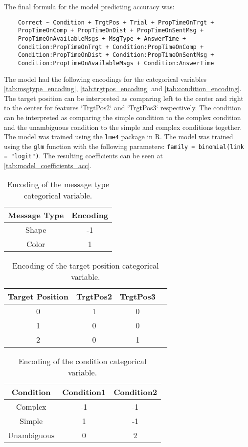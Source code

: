 The final formula for the model predicting accuracy was:
\begin{verbatim}
    Correct ~ Condition + TrgtPos + Trial + PropTimeOnTrgt +
    PropTimeOnComp + PropTimeOnDist + PropTimeOnSentMsg + 
    PropTimeOnAvailableMsgs + MsgType + AnswerTime + 
    Condition:PropTimeOnTrgt + Condition:PropTimeOnComp +
    Condition:PropTimeOnDist + Condition:PropTimeOnSentMsg +
    Condition:PropTimeOnAvailableMsgs + Condition:AnswerTime
\end{verbatim}
The model had the following encodings for the categorical variables \autoref{tab:msgtype_encoding}, \autoref{tab:trgtpos_encoding} and \autoref{tab:condition_encoding}. The target position can be interpreted as comparing left to the center and right to the center for features `TrgtPos2` and `TrgtPos3` respectively. The condition can be interpreted as comparing the simple condition to the complex condition and the unambiguous condition to the simple and complex conditions together. The model was trained using the \texttt{lme4} package in R. The model was trained using the \texttt{glm} function with the following parameters: \texttt{family = binomial(link = "logit")}. The resulting coefficients can be seen at \autoref{tab:model_coefficients_acc}.
\begin{table}[h!]
\centering
\begin{tabular}{|c|c|}
\hline
Message Type & Encoding \\ \hline
Shape        & -1       \\ \hline
Color        & 1        \\ \hline
\end{tabular}
\caption{Encoding of the message type categorical variable.}
\label{tab:msgtype_encoding}
\end{table}
\hfill
\begin{table}[h!]
\centering
\begin{tabular}{|c|c|c|c|}
\hline
Target Position & TrgtPos2 & TrgtPos3\\ \hline
0               & 1    & 0    \\ \hline
1               & 0    & 0    \\ \hline
2               & 0    & 1    \\ \hline
\end{tabular}
\caption{Encoding of the target position categorical variable.}
\label{tab:trgtpos_encoding}
\end{table}
\begin{table}[h!]
\centering
\begin{tabular}{|c|c|c|}
\hline
Condition     & Condition1 & Condition2 \\ \hline
Complex       & -1   & -1   \\ \hline
Simple        & 1    & -1   \\ \hline
Unambiguous   & 0    & 2    \\ \hline
\end{tabular}
\caption{Encoding of the condition categorical variable.}
\label{tab:condition_encoding}
\end{table}



